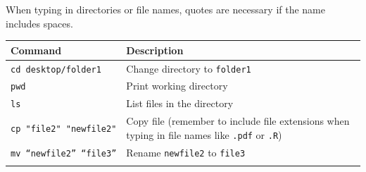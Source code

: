 \documentclass[]{book}
\begin{document}
When typing in directories or file names, quotes are necessary if the name includes spaces.

\begin{longtable}[]{@{}ll@{}}
\toprule
\begin{minipage}[b]{0.41\columnwidth}\raggedright
Command\strut
\end{minipage} & \begin{minipage}[b]{0.53\columnwidth}\raggedright
Description\strut
\end{minipage}\tabularnewline
\midrule
\endhead
\begin{minipage}[t]{0.41\columnwidth}\raggedright
\texttt{cd\ desktop/folder1}\strut
\end{minipage} & \begin{minipage}[t]{0.53\columnwidth}\raggedright
Change directory to \texttt{folder1}\strut
\end{minipage}\tabularnewline
\begin{minipage}[t]{0.41\columnwidth}\raggedright
\texttt{pwd}\strut
\end{minipage} & \begin{minipage}[t]{0.53\columnwidth}\raggedright
Print working directory\strut
\end{minipage}\tabularnewline
\begin{minipage}[t]{0.41\columnwidth}\raggedright
\texttt{ls}\strut
\end{minipage} & \begin{minipage}[t]{0.53\columnwidth}\raggedright
List files in the directory\strut
\end{minipage}\tabularnewline
\begin{minipage}[t]{0.41\columnwidth}\raggedright
\texttt{cp\ "file2"\ "newfile2"}\strut
\end{minipage} & \begin{minipage}[t]{0.53\columnwidth}\raggedright
Copy file (remember to include file extensions when typing in file names like \texttt{.pdf} or \texttt{.R})\strut
\end{minipage}\tabularnewline
\begin{minipage}[t]{0.41\columnwidth}\raggedright
\texttt{mv\ “newfile2”\ “file3”}\strut
\end{minipage} & \begin{minipage}[t]{0.53\columnwidth}\raggedright
Rename \texttt{newfile2} to \texttt{file3}\strut
\end{minipage}\tabularnewline
\begin{minipage}[t]{0.41\columnwidth}\raggedright

\end{minipage}
\end{longtable}
\end{document}
